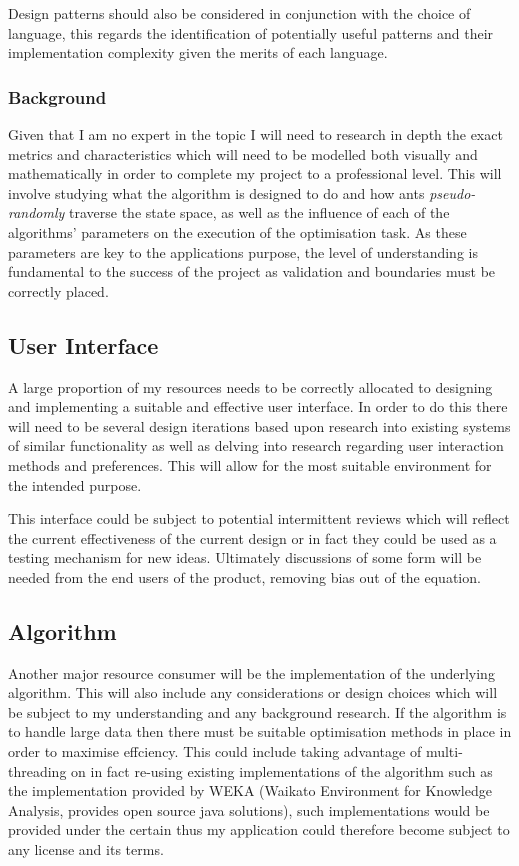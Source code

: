 \documentclass[10pt,a4paper]{article}
\begin{document}
Design patterns should also be considered in conjunction with the choice of language, this regards the identification of potentially useful patterns and their implementation complexity given the merits of each language.

		\subsubsection{Background}
Given that I am no expert in the topic I will need to research in depth the exact metrics and characteristics which will need to be modelled both visually and mathematically in order to complete my project to a professional level. This will involve studying what the algorithm is designed to do and how ants \textit{pseudo-randomly} traverse the state space, as well as the influence of each of the algorithms' parameters on the execution of the optimisation task. As these parameters are key to the applications purpose, the level of understanding is fundamental to the success of the project as validation and boundaries must be correctly placed.

	\subsection{User Interface}
A large proportion of my resources needs to be correctly allocated to designing and implementing a suitable and effective user interface. In order to do this there will need to be several design iterations based upon research into existing systems of similar functionality as well as delving into research regarding user interaction methods and preferences. This will allow for the most suitable environment for the intended purpose.

This interface could be subject to potential intermittent reviews which will reflect the current effectiveness of the current design or in fact they could be used as a testing mechanism for new ideas. Ultimately discussions of some form will be needed from the end users of the product, removing bias out of the equation. 


\subsection{Algorithm}
Another major resource consumer will be the implementation of the underlying algorithm. This will also include any considerations or design choices which will be subject to my understanding and any background research. If the algorithm is to handle large data then there must be suitable optimisation methods in place in order to maximise effciency. This could include taking advantage of multi-threading on in fact re-using existing implementations of the algorithm such as the implementation provided by WEKA (Waikato Environment for Knowledge Analysis, provides open source java solutions), such implementations would be provided under the certain thus my application could therefore become subject to any license and its terms. 
\end{document}
